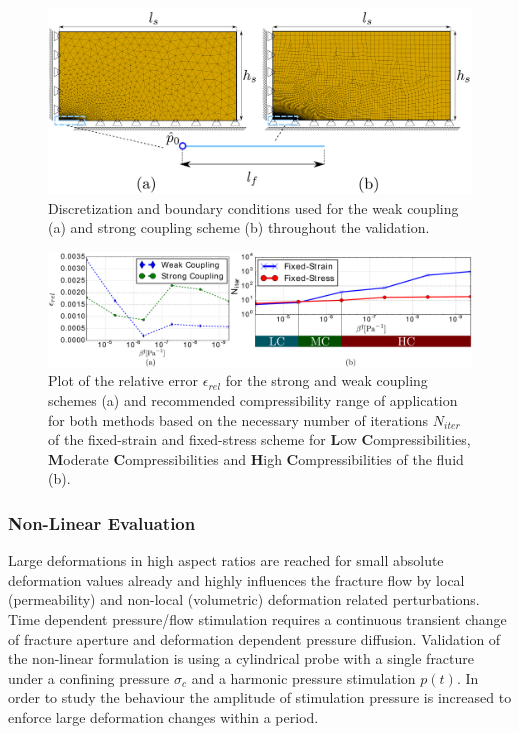 \begin{figure}[!ht]
\centering
\includegraphics[width=1\linewidth]{figures/ME9_benchmark_set_up.pdf}
\caption{Discretization and boundary conditions used for the weak coupling (a) and strong coupling scheme
(b) throughout the validation.}
\label{fig:ME9_validation_set_up}
\end{figure}
\begin{figure}
\centering
\includegraphics[width=1\linewidth]{figures/ME9_compressibility_study.pdf}
\caption{Plot of the relative error $\epsilon_{rel}$ for the strong and weak coupling schemes (a) and recommended compressibility range of application for both methods based on the necessary number of iterations $N_{iter}$ of the fixed-strain and fixed-stress scheme for \textbf{L}ow \textbf{C}ompressibilities, \textbf{M}oderate \textbf{C}ompressibilities and \textbf{H}igh \textbf{C}ompressibilities of the fluid (b).}
\label{fig:ME9_validation_compressibility}
\end{figure}

\subsubsection*{Non-Linear Evaluation}
Large deformations in high aspect ratios are reached for small absolute deformation values already and highly influences the fracture flow by local (permeability) and non-local (volumetric) deformation related perturbations. Time dependent pressure/flow stimulation requires a continuous transient change of fracture aperture and deformation dependent pressure diffusion. Validation of the non-linear formulation is using a cylindrical probe with a single fracture under a confining pressure $\sigma_c$ and a harmonic pressure stimulation $p(t)$. In order to study the behaviour the amplitude of stimulation pressure is increased to enforce large deformation changes within a period.


